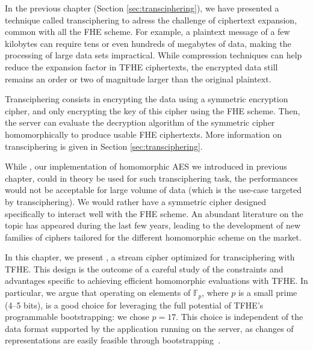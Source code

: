 In the previous chapter (Section \ref{sec:transciphering}), we have presented a technique called transciphering to adress the challenge of ciphertext expansion, common with all the \gls{FHE} scheme. For example, a plaintext message of a few kilobytes can require tens or even hundreds of megabytes of data, making the processing of large data sets impractical. While compression techniques can help reduce the expansion factor in \gls{TFHE} ciphertexts, the encrypted data still remains an order or two of magnitude larger than the original plaintext.


Transciphering consists in encrypting the data using a symmetric encryption cipher, and only encrypting the key of this cipher using the \gls{FHE} scheme. Then, the server can evaluate the decryption algorithm of the symmetric cipher homomorphically to produce usable \gls{FHE} ciphertexts. More information on transciphering is given in Section \ref{sec:transciphering}.


While \hippo, our implementation of homomorphic \gls{AES} we introduced in previous chapter, could in theory be used for such transciphering task, the performances would not be acceptable for large volume of data (which is the use-case targeted by transciphering). We would rather have a symmetric cipher designed specifically to interact well with the \gls{FHE} scheme. An abundant literature on the topic has appeared during the last few years, leading to the development of new families of ciphers tailored for the different homomorphic scheme on the market.


In this chapter, we present \coolName{}, a stream cipher optimized for transciphering with \gls{TFHE}. This design is the outcome of a careful study of the constraints and advantages specific to achieving efficient homomorphic evaluations with \gls{TFHE}. In particular, we argue that operating on elements of $\mathbb{F}_p$, where $p$ is a small prime (4--5 bits), is a good choice for leveraging the full potential of \gls{TFHE}’s programmable bootstrapping: we chose $p=17$. This choice is independent of the data format supported by the application running on the server, as changes of representations are easily feasible through bootstrapping~\cite{JC:BBBCLO23}.


